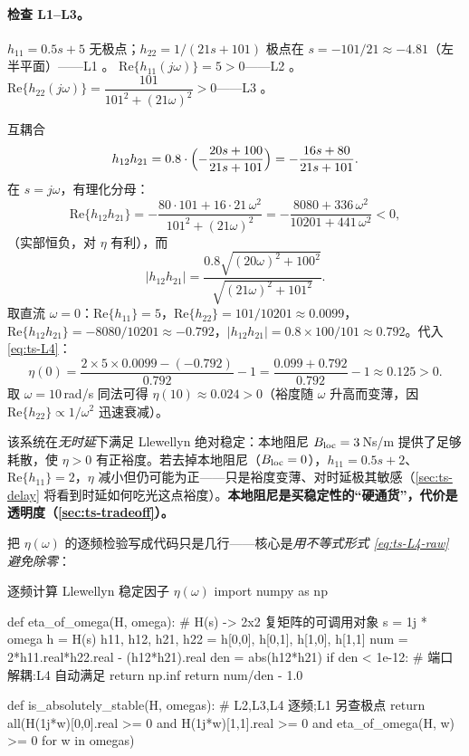 \paragraph{检查 L1--L3。}
$h_{11}=0.5s+5$ 无极点；$h_{22}=1/(21s+101)$ 极点在 $s=-101/21\approx-4.81$（左半平面）——L1 \checkmark。
$\mathrm{Re}\{h_{11}(j\omega)\}=5>0$——L2 \checkmark。
$\mathrm{Re}\{h_{22}(j\omega)\}=\dfrac{101}{101^2+(21\omega)^2}>0$——L3 \checkmark。

\begin{derivation}
互耦合
\[
  h_{12}h_{21}=0.8\cdot\Bigl(-\frac{20s+100}{21s+101}\Bigr)=-\frac{16s+80}{21s+101}.
\]
在 $s=j\omega$，有理化分母：
\[
  \mathrm{Re}\{h_{12}h_{21}\}=-\frac{80\cdot101+16\cdot21\,\omega^2}{101^2+(21\omega)^2}
  =-\frac{8080+336\,\omega^2}{10201+441\,\omega^2}<0,
\]
（实部恒负，对 $\eta$ 有利），而
\[
  |h_{12}h_{21}|=\frac{0.8\sqrt{(20\omega)^2+100^2}}{\sqrt{(21\omega)^2+101^2}}.
\]
取直流 $\omega=0$：$\mathrm{Re}\{h_{11}\}=5$，$\mathrm{Re}\{h_{22}\}=101/10201\approx0.0099$，$\mathrm{Re}\{h_{12}h_{21}\}=-8080/10201\approx-0.792$，$|h_{12}h_{21}|=0.8\times100/101\approx0.792$。代入 \cref{eq:ts-L4}：
\[
  \eta(0)=\frac{2\times5\times0.0099-(-0.792)}{0.792}-1
  =\frac{0.099+0.792}{0.792}-1\approx0.125>0.
\]
取 $\omega=10\,$rad/s 同法可得 $\eta(10)\approx0.024>0$（裕度随 $\omega$ 升高而变薄，因 $\mathrm{Re}\{h_{22}\}\propto1/\omega^2$ 迅速衰减）。
\end{derivation}

\begin{insight}[结论与敏感性]
该系统在\emph{无时延}下满足 Llewellyn 绝对稳定：本地阻尼 $B_{\rm loc}=3\,$Ns/m 提供了足够耗散，使 $\eta>0$ 有正裕度。若去掉本地阻尼（$B_{\rm loc}=0$），$h_{11}=0.5s+2$、$\mathrm{Re}\{h_{11}\}=2$，$\eta$ 减小但仍可能为正——只是裕度变薄、对时延极其敏感（\cref{sec:ts-delay} 将看到时延如何吃光这点裕度）。\textbf{本地阻尼是买稳定性的“硬通货”，代价是透明度（\cref{sec:ts-tradeoff}）。}
\end{insight}

\noindent 把 $\eta(\omega)$ 的逐频检验写成代码只是几行——核心是\emph{用不等式形式 \cref{eq:ts-L4-raw} 避免除零}：

\begin{codebox}[Python]{逐频计算 Llewellyn 稳定因子 $\eta(\omega)$}
import numpy as np

def eta_of_omega(H, omega):           # H(s) -> 2x2 复矩阵的可调用对象
    s = 1j * omega
    h = H(s)
    h11, h12, h21, h22 = h[0,0], h[0,1], h[1,0], h[1,1]
    num = 2*h11.real*h22.real - (h12*h21).real
    den = abs(h12*h21)
    if den < 1e-12:                   # 端口解耦:L4 自动满足
        return np.inf
    return num/den - 1.0

def is_absolutely_stable(H, omegas):  # L2,L3,L4 逐频;L1 另查极点
    return all(H(1j*w)[0,0].real >= 0 and H(1j*w)[1,1].real >= 0
               and eta_of_omega(H, w) >= 0 for w in omegas)
\end{codebox}

